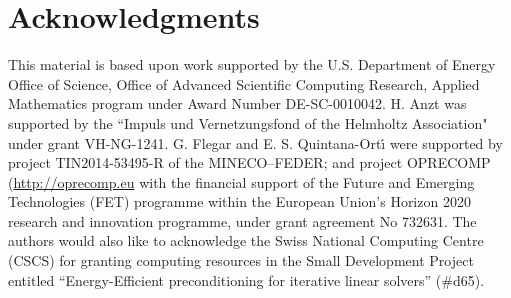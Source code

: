 \section*{Acknowledgments}
This material is based upon work supported by the U.S. Department
of Energy Office of Science, Office of Advanced Scientific Computing
Research, Applied Mathematics program under Award Number
DE-SC-0010042.  
H. Anzt was supported by the ``Impuls und Vernetzungsfond of the Helmholtz Association" 
under grant VH-NG-1241.
G. Flegar and E. S. Quintana-Ort\'{\i} were supported
by project TIN2014-53495-R of the MINECO--FEDER;
and project OPRECOMP (\url{http://oprecomp.eu} 
with the financial support of the Future and Emerging Technologies (FET) programme within the 
European Union's Horizon 2020 research and innovation programme, under grant agreement No 732631.
The authors would also like to acknowledge the Swiss National
Computing Centre (CSCS) for granting computing resources
in the Small Development Project entitled ``Energy-Efficient
preconditioning for iterative linear solvers'' (\#d65).
